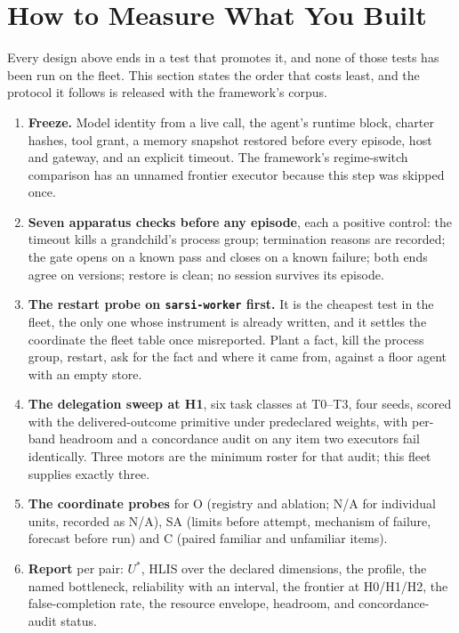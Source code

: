 \documentclass[11pt]{article}
\theoremstyle{definition}
\begin{document}
\section{How to Measure What You Built}\label{sec:measure}

Every design above ends in a test that promotes it, and none of those tests has been run on the fleet. This section states the order that costs least, and the protocol it follows is released with the framework's corpus.

\begin{enumerate}[leftmargin=*]
\item \textbf{Freeze.} Model identity from a live call, the agent's runtime block, charter hashes, tool grant, a memory snapshot restored before every episode, host and gateway, and an explicit timeout. The framework's regime-switch comparison has an unnamed frontier executor because this step was skipped once.
\item \textbf{Seven apparatus checks before any episode}, each a positive control: the timeout kills a grandchild's process group; termination reasons are recorded; the gate opens on a known pass and closes on a known failure; both ends agree on versions; restore is clean; no session survives its episode.
\item \textbf{The restart probe on \texttt{sarsi-worker} first.} It is the cheapest test in the fleet, the only one whose instrument is already written, and it settles the coordinate the fleet table once misreported. Plant a fact, kill the process group, restart, ask for the fact and where it came from, against a floor agent with an empty store.
\item \textbf{The delegation sweep at H1}, six task classes at T0--T3, four seeds, scored with the delivered-outcome primitive under predeclared weights, with per-band headroom and a concordance audit on any item two executors fail identically. Three motors are the minimum roster for that audit; this fleet supplies exactly three.
\item \textbf{The coordinate probes} for O (registry and ablation; N/A for individual units, recorded as N/A), SA (limits before attempt, mechanism of failure, forecast before run) and C (paired familiar and unfamiliar items).
\item \textbf{Report} per pair: $U^{*}$, HLIS over the declared dimensions, the profile, the named bottleneck, reliability with an interval, the frontier at H0/H1/H2, the false-completion rate, the resource envelope, headroom, and concordance-audit status.
\end{enumerate}
\end{document}
